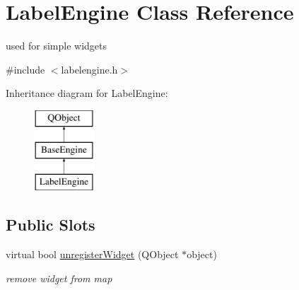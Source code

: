 \hypertarget{class_label_engine}{}\section{Label\+Engine Class Reference}
\label{class_label_engine}


used for simple widgets  




{\ttfamily \#include $<$labelengine.\+h$>$}

Inheritance diagram for Label\+Engine\+:\begin{figure}[H]
\begin{center}
\leavevmode
\includegraphics[height=3.000000cm]{class_label_engine}
\end{center}
\end{figure}
\subsection*{Public Slots}
\begin{DoxyCompactItemize}
\item 
\mbox{\label{class_label_engine_a09144f8352c32ae8d4109ec3717d3ccd}} 
virtual bool \hyperlink{class_label_engine_a09144f8352c32ae8d4109ec3717d3ccd}{unregister\+Widget} (Q\+Object $\ast$object)
\begin{DoxyCompactList}\small\item\em remove widget from map \end{DoxyCompactList}\end{DoxyCompactItemize}
